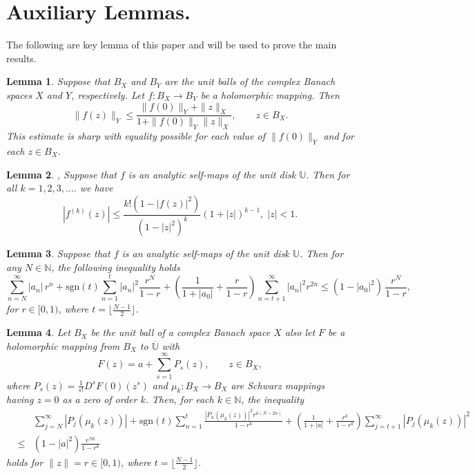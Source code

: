 \documentclass[11pt, reqno]{amsart}
\newtheorem*{cor A}{Corollary A}
\newtheorem*{cor B}{Corollary B}
\newtheorem{lem}{Lemma}[section]
\newcommand{\ol}{\overline}
\newcommand{\beas}{\begin{eqnarray*}}
\newcommand{\eeas}{\end{eqnarray*}}
\numberwithin{equation}{section}
\begin{document}
\section{{\bf Auxiliary Lemmas.}} 
The following are key lemma of this paper and will be used to prove the main results.
\begin{lem}\label{L1} \cite{CHPV}
Suppose that $B_{X}$ and $B_{Y}$ are the unit balls of the complex Banach spaces $X$ and $Y$, respectively. Let $f: B_{X} \to B_{Y}$ be a holomorphic mapping. Then
\begin{equation*}
\|f(z)\|_{Y} \le \frac{\|f(0)\|_{Y} + \|z\|_{X}}{1 + \|f(0)\|_{Y}\|z\|_{X}}, \qquad z \in B_{X}.
\end{equation*}
This estimate is sharp with equality possible for each value of $\|f(0)\|_{Y}$ and for each $z \in B_{X}$.
\end{lem}
\begin{lem}\label{L20}\cite{DP2008}, \cite[Theorem 2]{R1985} Suppose that $f$ is an analytic self-maps of the unit disk $\mathbb{U}$.  Then for all $k=1, 2, 3,....$ we have 
\[|f^{(k)}(z)|\leq \frac{k!(1-|f(z)|^2)}{(1-|z|^2)^k}(1+|z|)^{k-1},\;|z|<1.\]
\end{lem}
\begin{lem}\label{L2}\cite{LLP2021}
Suppose that $f$ is an analytic self-maps of the unit disk $\mathbb{U}$. Then for any $N\in \mathbb{N}$, the  following inequality holds
\[\sum_{n=N}^{\infty} |a_n|\, r^{n}+\text{sgn}(t)\sum_{n=1}^t|a_n|^2\frac{r^N}{1-r}+ \left( \frac{1}{1+|a_0|}+ \frac{r}{1-r} \right)\sum_{n=t+1}^{\infty} |a_n|^{2} r^{2n}\le (1-|a_0|^{2})\,\frac{r^N}{1-r},\]
for $r\in [0,1)$, where $t=\lfloor \frac{N-1}{2}\rfloor$.
\end{lem}

\begin{lem}\label{L3}
Let $B_{X}$ be the unit ball of a complex Banach space $X$ also let $F$ be a holomorphic mapping from $B_{X}$ to $\ol{\mathbb{U}}$ with
\[
F(z)=a+\sum_{s=1}^{\infty}P_{s}(z), \qquad z\in B_{X},
\]
where $P_{s}(z)=\frac{1}{s!}D^{s}F(0)(z^{s})$ and   $\mu_k:B_{X}\to B_{X}$ are  Schwarz mappings having $z=0$ as a zero of order $k$. Then, for each $k\in\mathbb{N}$, the inequality
\beas\label{eq:lemma3}
&&\sum_{j=N}^{\infty} |P_j(\mu_k(z))| +\text{sgn}(t)\sum_{n=1}^t\frac{|P_n(\mu_k(z))|^2r^{k(N-2n)}}{1-r^k}
+\left(\frac{1}{1+|a|}+\frac{r^k}{1-r^k}\right)
\sum_{j=t+1}^{\infty} |P_j(\mu_k(z))|^2\nonumber\\
&\le& (1-|a|^2)\frac{r^{Nk}}{1-r^k}
\eeas
holds for $\|z\|=r\in[0,1)$, where $t=\lfloor \frac{N-1}{2}\rfloor$.
\end{lem}
\end{document}
